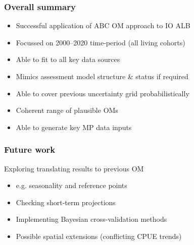 \documentclass{beamer}
\begin{document}
\begin{frame}
    \frametitle{Overall summary}
\begin{itemize}
    \item Successful application of ABC OM approach to IO ALB 
    \item Focussed on 2000--2020 time-period (all living cohorts)
    \item Able to fit to all key data sources
    \item Mimics assessment model structure \& status if required
    \item Able to cover previous uncertainty grid probabilistically
    \item Coherent range of plausible OMs
    \item Able to generate key MP data inputs
\end{itemize}
\end{frame}
\begin{frame}
    \frametitle{Future work}
    \item Exploring translating results to previous OM
  \begin{itemize}
    \item e.g. seasonality and reference points
  \end{itemize}
\begin{itemize}
    \item Checking short-term projections
    \item Implementing Bayesian cross-validation methods
    \item Possible spatial extensions (conflicting CPUE trends)
\end{itemize}
\end{frame}
\end{document}
